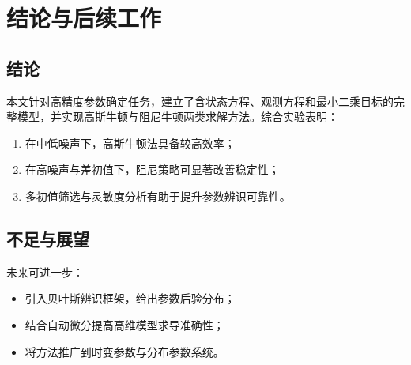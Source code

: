 \chapter{结论与后续工作}

\section{结论}
本文针对高精度参数确定任务，建立了含状态方程、观测方程和最小二乘目标的完整模型，并实现高斯牛顿与阻尼牛顿两类求解方法。综合实验表明：
\begin{enumerate}
  \item 在中低噪声下，高斯牛顿法具备较高效率；
  \item 在高噪声与差初值下，阻尼策略可显著改善稳定性；
  \item 多初值筛选与灵敏度分析有助于提升参数辨识可靠性。
\end{enumerate}

\section{不足与展望}
未来可进一步：
\begin{itemize}
  \item 引入贝叶斯辨识框架，给出参数后验分布；
  \item 结合自动微分提高高维模型求导准确性；
  \item 将方法推广到时变参数与分布参数系统。
\end{itemize}
